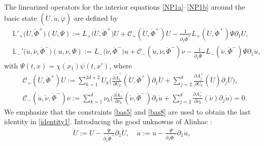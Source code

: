 \documentclass[twoside,11pt]{article}
\numberwithin{equation}{section}
\def\p{\partial}
\begin{document}
The linearized operators for the interior equations
\eqref{NP1a}--\eqref{NP1b} around the basic state $(\mathring{U},\mathring{u},\mathring{\varphi})$ are defined by
	\begin{align}
&	\mathbb{L}'_+\big(\mathring{U},\mathring{\Phi}^+\big)(U,\Psi)
	:=   {{L}_{+}\big(\mathring{U},\mathring{\Phi}^+\big) {U}+\mathcal{C}_{+}(\mathring{U},\mathring{\Phi}^+) {U}  -\frac{1}{\partial_1\mathring{\Phi}^+} {L}_+(\mathring{U},\mathring{\Phi}^+)\Psi \p_1 \mathring{U}},	\nonumber 	\\[0.5mm]	
&	\mathbb{L}_{-}'\big(\mathring{u},\mathring{{\nu}}, \mathring{\Phi}^-\big)(u,{\nu},\Psi)
	:=  {	L_-\big(\mathring{{\nu}} , \mathring{\Phi}^-\big) {u}
		+\mathcal{C}_{-}(\mathring{u},\mathring{\nu},\mathring{\Phi}^-)  {\nu}
		-\frac{1}{\partial_1\mathring{\Phi}^-} {L}_-(\mathring{\nu},\mathring{\Phi}^- )\Psi \p_1 \mathring{u} },\nonumber
\end{align}
with $\Psi(t,x)=\chi(x_1)\psi(t,x')$, where
\begin{align}	\nonumber %
	&\mathcal{C}_+(\mathring{U},\mathring{\Phi}^+)U:=
	\sum_{k=1}^{2d+2}U_k\bigg(
	\frac{\p \widetilde{A}^{+}_1}{\p {U_k}}(\mathring{U},\mathring{\Phi}^+) \partial_1 \mathring{U}
	+\sum_{j=2}^{d}\frac{\p A^{+}_j}{\p {U_k}}(\mathring{U}) \partial_j \mathring{U}
	\bigg),\\[0.5mm]
	&\mathcal{C}_{-}(\mathring{u},\mathring{\nu},\mathring{\Phi}^-)  {\nu}
	:=
	\sum_{k=1}^{d}\nu_k\bigg(
	\frac{\p \widetilde{A}^{-}_1}{\p {\nu_k}}(\mathring{\nu},\mathring{\Phi}^-) \partial_1 \mathring{u}
	+\sum_{j=2}^{d}\frac{\p A^{-}_j}{\p {\nu_k}}(\mathring{\nu}) \partial_j \mathring{u}	
	\bigg)=0.
	\label{identity1}
\end{align}
We emphasize that the constraints \eqref{bas5} and \eqref{bas8} are used to obtain the last identity in \eqref{identity1}.
Introducing the good unknowns of {\sc Alinhac} \cite{A89MR976971}:
\begin{align} \label{good}
	\dot{U}:=U-\frac{\Psi}{\partial_1 \mathring{\Phi}^+}\partial_1\mathring{U},
	\quad \dot{u}:=u-\frac{\Psi}{\p_1 \mathring{\Phi}^-}\p_1 \mathring{u},
\end{align}
\end{document}
